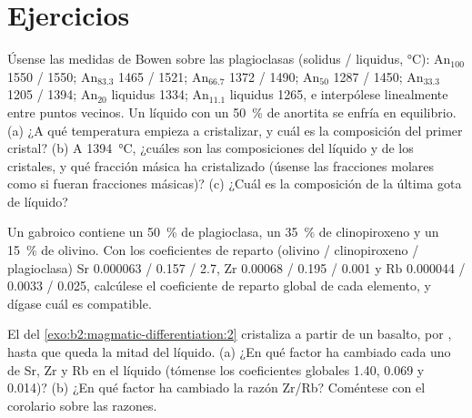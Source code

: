 \section{Ejercicios}

\begin{exercise}[$\star$]\label{exo:b2:magmatic-differentiation:1}
Úsense las medidas de Bowen sobre las plagioclasas (solidus / liquidus, \unit{\celsius}):
An$_{100}$ 1550 / 1550; An$_{83.3}$ 1465 / 1521; An$_{66.7}$ 1372 / 1490; An$_{50}$
1287 / 1450; An$_{33.3}$ 1205 / 1394; An$_{20}$ liquidus 1334; An$_{11.1}$ liquidus
1265, e interpólese linealmente entre puntos vecinos. Un líquido con un
\qty{50}{\percent} de anortita se enfría en equilibrio. (a) ¿A qué temperatura
empieza a cristalizar, y cuál es la composición del primer cristal? (b) A
\qty{1394}{\celsius}, ¿cuáles son las composiciones del líquido y de los cristales,
y qué fracción másica ha cristalizado (úsense las fracciones molares como si fueran fracciones
másicas)? (c) ¿Cuál es la composición de la última gota de líquido?
\end{exercise}

\begin{exercise}[$\star$]\label{exo:b2:magmatic-differentiation:2}
Un  gabroico contiene un \qty{50}{\percent} de plagioclasa, un \qty{35}{\percent} de
clinopiroxeno y un \qty{15}{\percent} de olivino. Con los coeficientes de reparto
(olivino / clinopiroxeno / plagioclasa) Sr 0.000063 / 0.157 / 2.7, Zr 0.00068 /
0.195 / 0.001 y Rb 0.000044 / 0.0033 / 0.025, calcúlese el coeficiente de reparto
global de cada elemento, y dígase cuál es compatible.
\end{exercise}

\begin{exercise}[$\star$]\label{exo:b2:magmatic-differentiation:3}
El  del \cref{exo:b2:magmatic-differentiation:2} cristaliza a partir de un basalto, por ,
hasta que queda la mitad del líquido. (a) ¿En qué factor ha cambiado cada uno de Sr, Zr y Rb
en el líquido (tómense los coeficientes globales 1.40, 0.069 y 0.014)? (b) ¿En qué factor
ha cambiado la razón Zr/Rb? Coméntese con el corolario sobre las razones.
\end{exercise}

